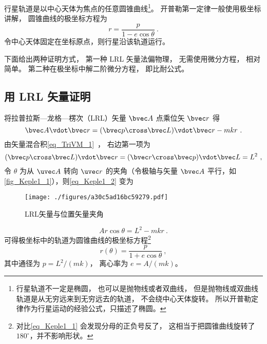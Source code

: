 

行星轨道是以中心天体为焦点的任意圆锥曲线\footnote{行星轨道不一定是椭圆， 也可以是抛物线或者双曲线， 但是抛物线或双曲线轨道是从无穷远来到无穷远去的轨道， 不会绕中心天体旋转。 所以开普勒定律作为行星运动的经验公式，只描述了椭圆。}。 开普勒第一定律一般使用极坐标讲解， 圆锥曲线的极坐标方程为
\begin{equation}\label{eq_Keple1_1}
r = \frac{p}{1 - e \cos \theta }~.
\end{equation}
令中心天体固定在坐标原点，则行星沿该轨道运行。

下面给出两种证明方式， 第一种 LRL 矢量法偏物理， 无需使用微分方程， 相对简单。 第二种在极坐标中解二阶微分方程， 即比耐公式。

\subsection{用 LRL 矢量证明}

将拉普拉斯—龙格—楞次（LRL）矢量 $\bvec A$ 点乘位矢 $\bvec r$ 得
\begin{equation}\label{eq_Keple1_2}
\bvec A \vdot \bvec r = (\bvec p \cross \bvec L)\vdot \bvec r - mkr~.
\end{equation}
由矢量混合积\autoref{eq_TriVM_1}~， 右边第一项为
\begin{equation}
(\bvec p \cross \bvec L)\vdot \bvec r = (\bvec r \cross \bvec p)\vdot \bvec L = L^2~,
\end{equation}
令 $\theta$ 为从 $\uvec A$ 转向 $\uvec r$ 的夹角（令极轴与矢量 $\bvec A$ 平行，如\autoref{fig_Keple1_1}），则\autoref{eq_Keple1_2} 变为
\begin{figure}[ht]
\centering
\texttt{[image: ./figures/a30c5ad16bc59279.pdf]}
\caption{LRL矢量与位置矢量夹角} \label{fig_Keple1_1}
\end{figure}
\begin{equation}
Ar\cos\theta = L^2 - mkr~.
\end{equation}
可得极坐标中的轨道为圆锥曲线的极坐标方程\footnote{对比\autoref{eq_Keple1_1} 会发现分母的正负号反了， 这相当于把圆锥曲线旋转了 $180^\circ$，并不影响形状。}
\begin{equation}
r(\theta) = \frac{p}{1 + e\cos\theta}~,
\end{equation}
其中通径为 $p = L^2/(mk)$， 离心率为 $e = A/(mk)$。

